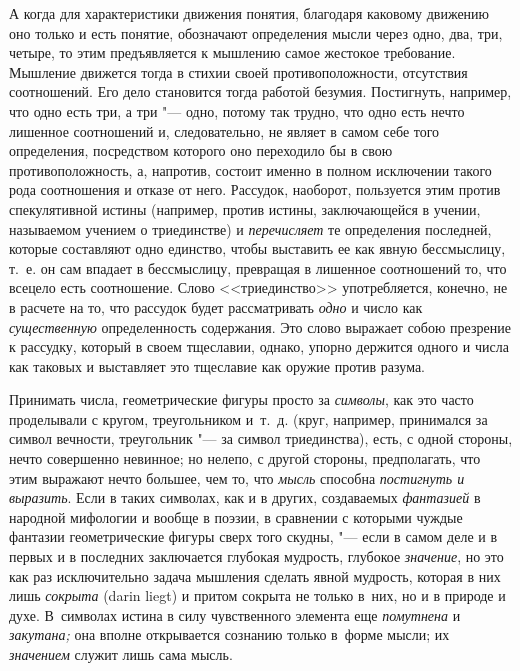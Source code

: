 А когда для характеристики движения понятия, благодаря каковому движению оно
только и есть понятие, обозначают определения мысли через одно, два, три,
четыре, то этим предъявляется к мышлению самое жестокое требование. Мышление
движется тогда в стихии своей противоположности, отсутствия соотношений. Его
дело становится тогда работой безумия. Постигнуть, например, что одно есть три,
а три "--- одно, потому так трудно, что одно есть нечто лишенное соотношений и,
следовательно, не являет в самом себе того определения, посредством которого
оно переходило бы в свою противоположность, а, напротив, состоит именно в
полном исключении такого рода соотношения и отказе от него. Рассудок, наоборот,
пользуется этим против спекулятивной истины (например, против истины,
заключающейся в учении, называемом учением о триединстве) и {\em перечисляет}
те определения последней, которые составляют одно единство, чтобы выставить ее
как явную бессмыслицу, т.~е. он сам впадает в бессмыслицу, превращая в лишенное
соотношений то, что всецело есть соотношение. Слово <<триединство>>
употребляется, конечно, не в расчете на то, что рассудок будет рассматривать
{\em одно} и число как {\em существенную} определенность содержания. Это слово
выражает собою презрение к рассудку, который в своем тщеславии, однако, упорно
держится одного и числа как таковых и выставляет это тщеславие как оружие
против разума.

Принимать числа, геометрические фигуры просто за {\em символы}, как это часто
проделывали с кругом, треугольником и~т.~д. (круг, например, принимался за
символ вечности, треугольник "--- за символ триединства), есть, с одной
стороны, нечто совершенно невинное; но нелепо, с другой стороны, предполагать,
что этим выражают нечто большее, чем то, что {\em мысль} способна {\em
постигнуть и выразить}. Если в таких символах, как и в других, создаваемых {\em
фантазией} в народной мифологии и вообще в поэзии, в сравнении с которыми
чуждые фантазии геометрические фигуры сверх того скудны, "--- если в самом деле
и в первых и в последних заключается глубокая мудрость, глубокое {\em
значение}, но это как раз исключительно задача мышления сделать явной мудрость,
которая в них лишь {\em сокрыта} (darin liegt) и притом сокрыта не только
в~них, но и в природе и духе. В~символах истина в силу чувственного элемента
еще {\em помутнена} и {\em закутана;} она вполне открывается сознанию только
в~форме мысли; их {\em значением} служит лишь сама мысль.

